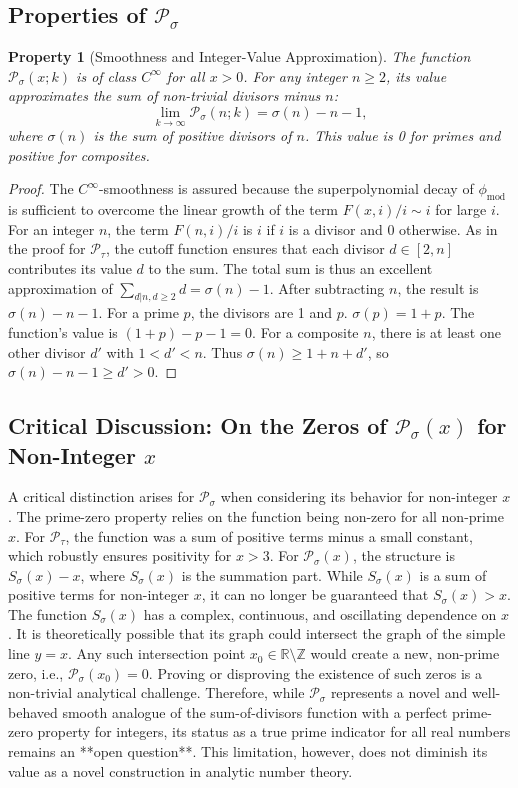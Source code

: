 \documentclass[11pt,a4paper]{amsart}
\newcommand{\Px}{\mathcal{P}}
\theoremstyle{plain}
\newtheorem{property}[theorem]{Property}
\theoremstyle{definition}
\begin{document}
\subsection{Properties of $\Px_{\sigma}$}

\begin{property}[Smoothness and Integer-Value Approximation]
The function $\Px_{\sigma}(x;k)$ is of class $C^\infty$ for all $x>0$.
For any integer $n\ge2$, its value approximates the sum of non-trivial divisors minus $n$:
\[ \lim_{k\to\infty} \Px_{\sigma}(n; k) = \sigma(n) - n - 1, \]
where $\sigma(n)$ is the sum of positive divisors of $n$.
This value is 0 for primes and positive for composites.
\end{property}
\begin{proof}
The $C^\infty$-smoothness is assured because the superpolynomial decay of $\phi_{\text{mod}}$ is sufficient to overcome the linear growth of the term $F(x,i)/i \sim i$ for large $i$.
For an integer $n$, the term $F(n,i)/i$ is $i$ if $i$ is a divisor and 0 otherwise.
As in the proof for $\Px_{\tau}$, the cutoff function ensures that each divisor $d \in [2,n]$ contributes its value $d$ to the sum.
The total sum is thus an excellent approximation of $\sum_{d|n, d\ge2} d = \sigma(n) - 1$.
After subtracting $n$, the result is $\sigma(n) - n - 1$.
For a prime $p$, the divisors are 1 and $p$. $\sigma(p)=1+p$. The function's value is $(1+p)-p-1=0$.
For a composite $n$, there is at least one other divisor $d'$ with $1<d'<n$.
Thus $\sigma(n) \ge 1+n+d'$, so $\sigma(n)-n-1 \ge d' > 0$.
\end{proof}

\subsection{Critical Discussion: On the Zeros of $\Px_{\sigma}(x)$ for Non-Integer $x$}
A critical distinction arises for $\Px_{\sigma}$ when considering its behavior for non-integer $x$.
The prime-zero property relies on the function being non-zero for all non-prime $x$.
For $\Px_{\tau}$, the function was a sum of positive terms minus a small constant, which robustly ensures positivity for $x>3$.
For $\Px_{\sigma}(x)$, the structure is $S_{\sigma}(x) - x$, where $S_{\sigma}(x)$ is the summation part.
While $S_{\sigma}(x)$ is a sum of positive terms for non-integer $x$, it can no longer be guaranteed that $S_{\sigma}(x) > x$.
The function $S_{\sigma}(x)$ has a complex, continuous, and oscillating dependence on $x$.
It is theoretically possible that its graph could intersect the graph of the simple line $y=x$.
Any such intersection point $x_0 \in \mathbb{R} \setminus \mathbb{Z}$ would create a new, non-prime zero, i.e., $\Px_{\sigma}(x_0) = 0$.
Proving or disproving the existence of such zeros is a non-trivial analytical challenge.
Therefore, while $\Px_{\sigma}$ represents a novel and well-behaved smooth analogue of the sum-of-divisors function with a perfect prime-zero property for integers, its status as a true prime indicator for all real numbers remains an **open question**.
This limitation, however, does not diminish its value as a novel construction in analytic number theory.
\end{document}
